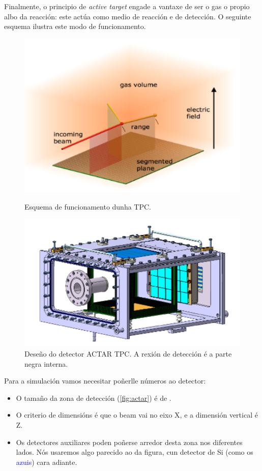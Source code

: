 \documentclass[11pt, a4paper]{article}
\begin{document}
Finalmente, o principio de \textit{active target} engade a vantaxe de ser o gas o propio albo da reacción: este actúa como medio de reacción e de detección. O seguinte esquema ilustra este modo de funcionamento.
\begin{figure}[!ht]
\begin{minipage}[b]{.45\textwidth}
\centering
\includegraphics[width=1\textwidth]{figures/tpc.png}
\caption{Esquema de funcionamento dunha TPC.}
\label{fig:tpc}
\end{minipage}
\hfill
\begin{minipage}[b]{.45\textwidth}
\centering
\includegraphics[width=1\textwidth]{figures/actar.png}
\caption{Deseño do detector ACTAR TPC. A rexión de detección é a parte negra interna.}
\label{fig:actar}
\end{minipage}
\end{figure}

Para a simulación vamos necesitar poñerlle números ao detector:
\begin{itemize}
    \item O tamaño da zona de detección (\autoref{fig:actar}) é de .
    \item O criterio de dimensións é que o beam vai no eixo X, e a dimensión vertical é Z.
    \item Os detectores auxiliares poden poñerse arredor desta zona nos diferentes lados. Nós usaremos algo parecido ao da figura, cun detector de Si (como os \textcolor{blue}{azuis}) cara adiante.
\end{itemize}
\end{document}
